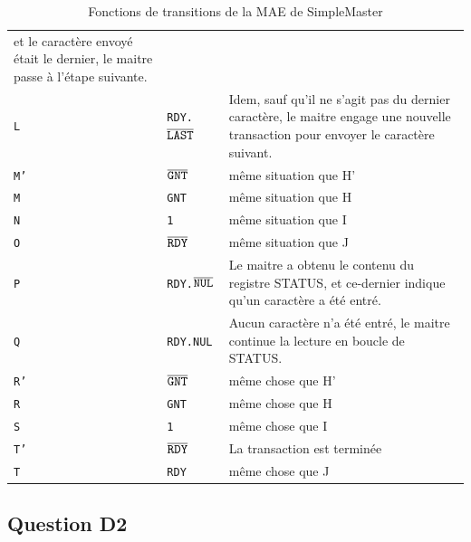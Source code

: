 \documentclass{article}
\begin{document}
\begin{table}[H]
\begin{tabular}{ | l | l | p{15cm} |}
et le caractère envoyé était le dernier, le maitre passe à l'étape suivante. \\
\tt{L}  & \tt{RDY.$\overline{\tt{LAST}}$} &
Idem, sauf qu'il ne s'agit pas du dernier caractère, le maitre engage une nouvelle transaction
pour envoyer le caractère suivant. \\
\hline
\tt{M'} & \tt{$\overline{\tt{GNT}}$} &
même situation que H' \\
\tt{M}  & \tt{GNT} &
même situation que H \\
\tt{N}  & \tt{1} &
même situation que I \\
\tt{O}  & \tt{$\overline{\tt{RDY}}$} &
même situation que J \\
\tt{P}  & \tt{RDY.$\overline{\tt{NUL}}$} &
Le maitre a obtenu le contenu du registre STATUS, et ce-dernier indique qu'un caractère
a été entré. \\
\tt{Q}  & \tt{RDY.NUL} &
Aucun caractère n'a été entré, le maitre continue la lecture en boucle de STATUS. \\
\hline
\tt{R'} & \tt{$\overline{\tt{GNT}}$} &
même chose que H' \\
\tt{R}  & \tt{GNT} &
même chose que H \\
\tt{S}  & \tt{1} &
même chose que I \\
\tt{T'} & \tt{$\overline{\tt{RDY}}$} &
La transaction est terminée \\
\tt{T}  & \tt{RDY} &
même chose que J \\
\hline
\end{tabular}
\endgroup
\caption{Fonctions de transitions de la MAE de SimpleMaster}
\end{table}

\subsection{Question D2}
\end{document}

